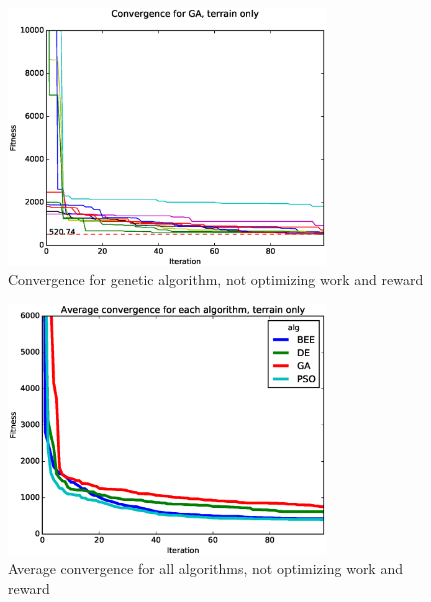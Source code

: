 \documentclass{tamuccthesis}
\begin{document}
\begin{figure}[H]
    \captionsetup{justification=centering}
    \centering
        \includegraphics[width=0.75\textwidth,trim={0cm 0.75cm 0cm 0.75cm},clip]{conv_GA_a.eps}
    \caption{Convergence for genetic algorithm, not optimizing work and reward}
    \label{fig:convergence_a_SGA}
\end{figure}

\begin{figure}[H]
    \captionsetup{justification=centering}
    \centering
        \includegraphics[width=0.75\textwidth,trim={0cm 0.75cm 0cm 0.75cm},clip]{conv_avg_a.eps}
    \caption{Average convergence for all algorithms, not optimizing work and reward}
    \label{fig:convergence_a_avg}
\end{figure}
\end{document}
